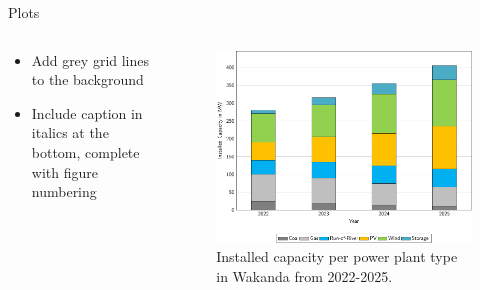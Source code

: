 \documentclass[aspectratio=169]{beamer}
\begin{document}
\begin{frame}{Plots}
\begin{columns}
\begin{column}{0.49\textwidth}
            \begin{coloredblock}
                    \begin{itemize}
                        \item \footnotesize Add grey grid lines to the background
                        \item \footnotesize Include caption in italics at the bottom, complete with figure numbering
                    \end{itemize}
            \end{coloredblock}
        \end{column}
        \begin{column}{0.49\textwidth}
            \vspace{1cm}
            \tiny
            \begin{overprint}
                \begin{figure}[htbp]
                    \includegraphics[width=\linewidth]{figures/installed_capacity_2022-2025.pdf}
                    \caption{\centering Installed capacity per power plant type in Wakanda from 2022-2025.}
                    \label{fig:installed_capacity}
            \end{figure}
    

\end{overprint}
\end{column}
\end{columns}
\end{frame}
\end{document}
